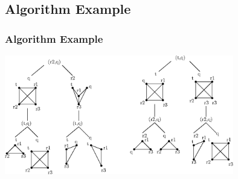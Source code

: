 \documentclass{beamer}
\begin{document}
\subsection{Algorithm Example}
\begin{frame}
\frametitle{Algorithm Example}
	\includegraphics[width=10cm]{re.eps}
\end{frame}


\end{document}
